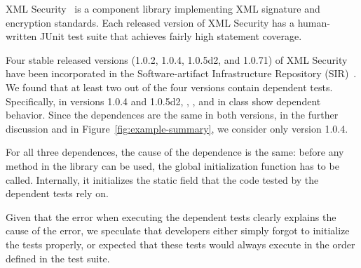 
XML Security~\cite{xmlsecurity}
is a component library implementing XML signature and encryption
standards. Each released
version of XML Security has a human-written JUnit test suite that
achieves fairly high statement coverage.

Four stable released versions (1.0.2, 1.0.4, 1.0.5d2, and 1.0.71) of XML Security
have been incorporated in the Soft\-ware-artifact Infrastructure Repository
(SIR)~\cite{sir}.
We found that at least two out of the four versions contain dependent tests. Specifically, in versions 1.0.4 and 1.0.5d2, , , and 
in class  show dependent behavior.
Since the dependences are the same in both versions, in the further
discussion and in Figure~\ref{fig:example-summary}, we consider only
version 1.0.4.

For all three dependences, the cause of the dependence is the same: before any
method in the library can be used, the global initialization function 
 has to be called. Internally, it initializes
the static field that the code tested by the dependent tests rely
on.

Given that the error when executing the dependent tests clearly explains the
cause of the error, we speculate that developers either simply forgot to
initialize the tests properly, or expected that these tests would always execute
in the order defined
in the test suite.

%
%


